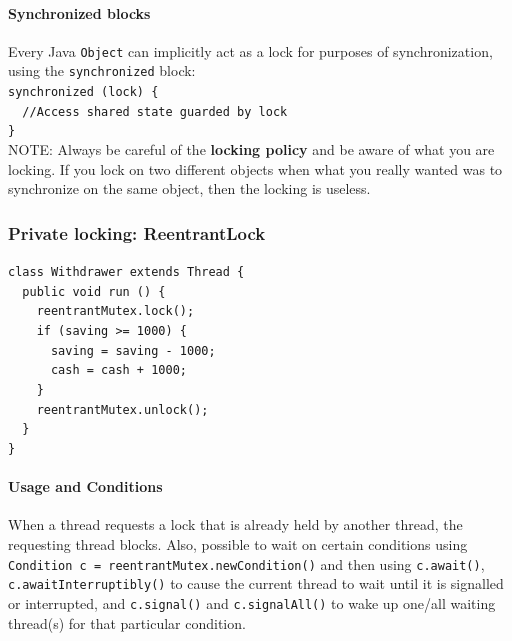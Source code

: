\documentclass{article}
\begin{document}
\paragraph{Synchronized blocks}
Every Java \lstinline{Object} can implicitly act as a lock for purposes of synchronization, using the \lstinline{synchronized} block:\\
    \lstinline|synchronized (lock) {|\\
    \lstinline|  //Access shared state guarded by lock|\\
    \lstinline|}|\\
NOTE: Always be careful of the \textbf{locking policy} and be aware of what you are locking. If you lock on two different objects when what you really wanted was to synchronize on the same object, then the locking is useless.

\subsubsection{Private locking: ReentrantLock}
\lstinline|class Withdrawer extends Thread {|\\
\lstinline|  public void run () {|\\
\lstinline|    reentrantMutex.lock();|\\
\lstinline|    if (saving >= 1000) {|\\
\lstinline|      saving = saving - 1000;|\\
\lstinline|      cash = cash + 1000;|\\
\lstinline|    }|\\
\lstinline|    reentrantMutex.unlock();|\\
\lstinline|  }|\\
\lstinline|}|

\paragraph{Usage and Conditions} When a thread requests a lock that is already held by another thread, the requesting thread blocks. Also, possible to wait on certain conditions using \lstinline{Condition c = reentrantMutex.newCondition()} and then using \lstinline{c.await()}, \lstinline{c.awaitInterruptibly()} to cause the current thread to wait until it is signalled or interrupted, and \lstinline{c.signal()} and \lstinline{c.signalAll()} to wake up one/all waiting thread(s) for that particular condition.
\end{document}
